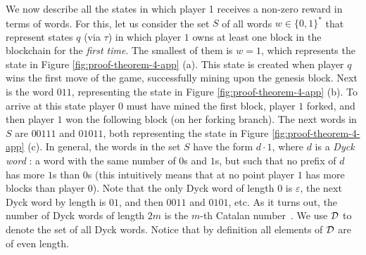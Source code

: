 We now  describe all the states in which player 1 receives a non-zero reward in terms of words. For this, let us consider the set $S$ of all words $w \in \{0,1\}^*$ that represent states $q$ (via $\tau$) in which player $1$ owns at least one block in the blockchain for the {\em first time}. 
The smallest of them is $w = 1$, which represents the state in Figure \ref{fig:proof-theorem-4-app} (a). This state is created when player $q$ wins the first move of the game, successfully mining upon the genesis block. Next is the word $011$, representing the state in Figure \ref{fig:proof-theorem-4-app} (b). To arrive at this state player $0$ must have mined the first block, player $1$ forked, and then player $1$ 
won the following block (on her forking branch). The next words in $S$ are $00111$ and $01011$, both representing the state in Figure \ref{fig:proof-theorem-4-app} (c). 
In general, the words in the set $S$ have the form $d\cdot 1$, where $d$ is a \emph{Dyck word} \cite{stanley2015catalan}: a word with the same number of $0$s and $1$s, but such that 
no prefix of $d$ has more $1$s than $0$s (this intuitively means that at no point player $1$ has more blocks than player $0$). 
Note that the only Dyck word of length $0$ is $\varepsilon$, the next Dyck word by length is $01$, and then $0011$ and $0101$, etc. As it turns out, the number of Dyck words of length $2m$ is the $m$-th Catalan number~\cite{stanley2015catalan}. We use $\mathcal{D}$ to denote the set of all Dyck words. Notice that by definition all elements of $\mathcal{D}$ are of even length.


